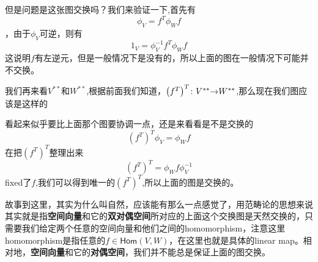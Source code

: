 \documentclass[UTF8,11pt,a4paper]{ctexart}%
\begin{document}
但是问题是这张图交换吗？我们来验证一下,首先有\[\phi_{V}=f^{T}\phi_{W}f\]，由于$\phi_{V}$可逆，则有\[1_{V}=\phi_{V}^{-1}f^{T}\phi_{W}f\]这说明$f$有左逆元，但是一般情况下是没有的，所以上面的图在一般情况下可能并不交换。

我们再来看$V^{**}$和$W^{**}$,根据前面我们知道，${{\left(f^{T}\right)}^{T}}\colon{V^{**}}{\to}{W^{**}}$,那么现在我们图应该是这样的
\begin{center}
\end{center}
看起来似乎要比上面那个图要协调一点，还是来看看是不是交换的\[{\left(f^{T}\right)}^{T}\phi_{V}=\phi_Wf\]在把${\left(f^{T}\right)}^{T}$整理出来\[{\left(f^{T}\right)}^{T}=\phi_Wf\phi_V^{-1}\]fixed了$f$,我们可以得到唯一的${\left(f^{T}\right)}^{T}$,所以上面的图是交换的。

故事到这里，其实为什么叫自然，应该能有那么一点感觉了，用范畴论的思想来说其实就是指\textbf{空间向量}和它的\textbf{双对偶空间}所对应的上面这个交换图是天然交换的，只需要我们给定两个任意的空间向量和他们之间的homomorphism，注意这里homomorphism是指任意的$f \in \textsf{Hom}(V,W)$，在这里也就是具体的linear map。相对地，\textbf{空间向量}和它的\textbf{对偶空间}，我们并不能总是保证上面的图交换。
\end{document}
